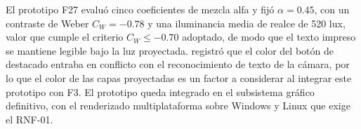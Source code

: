 El prototipo F27 evaluó cinco coeficientes de mezcla alfa y fijó $\alpha = 0.45$, con un contraste de Weber $C_W = -0.78$ y una iluminancia media de realce de 520 lux, valor que cumple el criterio $C_W \le -0.70$ adoptado, de modo que el texto impreso se mantiene legible bajo la luz proyectada. \cite{ibaceta2023evaluacion} registró que el color del botón de destacado entraba en conflicto con el reconocimiento de texto de la cámara, por lo que el color de las capas proyectadas es un factor a considerar al integrar este prototipo con F3. El prototipo queda integrado en el subsistema gráfico definitivo, con el renderizado multiplataforma sobre Windows y Linux que exige el RNF-01.